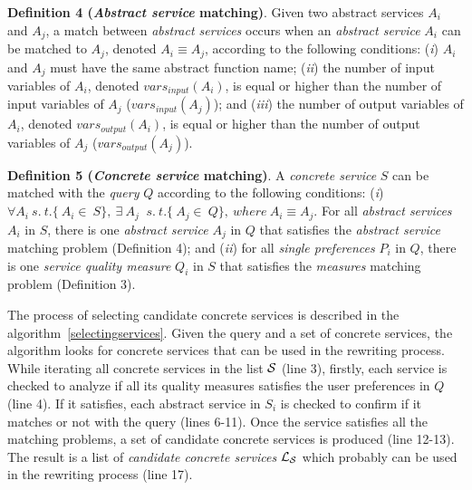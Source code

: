 \noindent \textbf{Definition 4 (\textit{Abstract service} matching)}.
Given two abstract services $A_{i}$ and $A_{j}$, a match between \textit{abstract services} occurs when an \textit{abstract service} $A_{i}$ can be matched to $A_{j}$, denoted $A_{i} \equiv A_{j}$, according to the following conditions: 
(\textit{i}) $A_{i}$ and $A_{j}$ must have the same abstract function name; 
(\textit{ii}) the number of input variables of $A_{i}$, denoted $vars_{input}(A_{i})$, is equal or higher than the number of input variables of $A_{j}$ ($vars_{input}(A_{j})$); and 
(\textit{iii}) the number of output variables of $A_{i}$, denoted $vars_{output}(A_{i})$, is equal or higher than the number of output variables of $A_{j}$ ($vars_{output}(A_{j})$).
\bigskip

\noindent \textbf{Definition 5 (\textit{Concrete service} matching)}.
A \textit{concrete service} $S$ can be matched with the \textit{query} $Q$ according to the following conditions:
(\textit{i}) $\forall A_{i}  \ s. \ t. \lbrace\ A_{i} \in \ S\rbrace, \ \exists \ A_{j} \ $ $s. \ t. \lbrace\ A_{j} \in \ Q\rbrace, \ where \ A_{i} \equiv A_{j}.$ For all \textit{abstract services} $A_{i}$ in $S$, there is one \textit{abstract service} $A_{j}$ in $Q$ that satisfies the \textit{abstract service} matching problem (Definition 4); and (\textit{ii}) for all \textit{single preferences} $P_{i}$ in $Q$, there is one
\textit{service quality measure} $Q_{i}$ in $S$ that satisfies the \textit{measures} matching problem (Definition 3).


The process of selecting candidate concrete services
is described in the algorithm~\ref{selectingservices}.
Given the query and a set of concrete services, the algorithm
looks for concrete services that can be used in the rewriting process.
While iterating all concrete services in the list $\hbox{${\cal S}$}$ (line 3), firstly,
each service is checked to analyze if all its quality measures satisfies the user preferences
in $Q$ (line 4). If it satisfies, each abstract service in $S_{i}$ is checked to confirm if 
it matches or not with the query (lines 6-11). Once the service satisfies all the matching 
problems, a set of candidate concrete services is produced (line 12-13). The result
is a list of \textit{candidate concrete services} $\hbox{${\cal L_{S}}$}$ which
probably can be used in the rewriting process (line 17).

